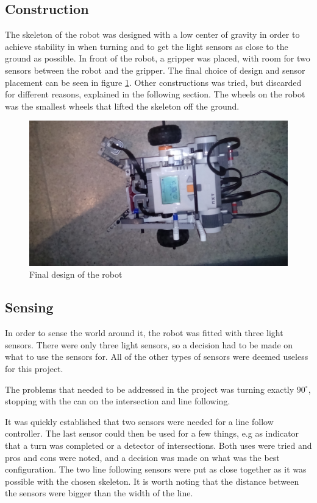 \subsection{Construction}
The skeleton of the robot was designed with a low center of gravity in order to achieve stability in when turning and to get the light sensors as close to the ground as possible.
In front of the robot, a gripper was placed, with room for two sensors between the robot and the gripper. The final choice of design and sensor placement can be seen in figure \ref{fig:final_robot}. Other constructions was tried, but discarded for different reasons, explained in the following section. The wheels on the robot was the smallest wheels that lifted the skeleton off the ground.

\begin{figure}[H]
\centering
 \includegraphics[scale = 0.1]{img/robot.jpg}
 \caption{Final design of the robot}
 \label{fig:final_robot}
\end{figure}

\subsection{Sensing}\label{sec:sensing}
In order to sense the world around it, the robot was fitted with three light sensors. There were only three light sensors, so a decision had to be made on what to use the sensors for. All of the other types of sensors were deemed useless for this project.

The problems that needed to be addressed in the project was turning exactly $90^{\circ}$, stopping with the can on the intersection and line following.

It was quickly established that two sensors were needed for a line follow controller. The last sensor could then be used for a few things, e.g as indicator that a turn was completed or a detector of intersections. Both uses were tried and pros and cons were noted, and a decision was made on what was the best configuration. The two line following sensors were put as close together as it was possible with the chosen skeleton. It is worth noting that the distance between the sensors were bigger than the width of the line.

